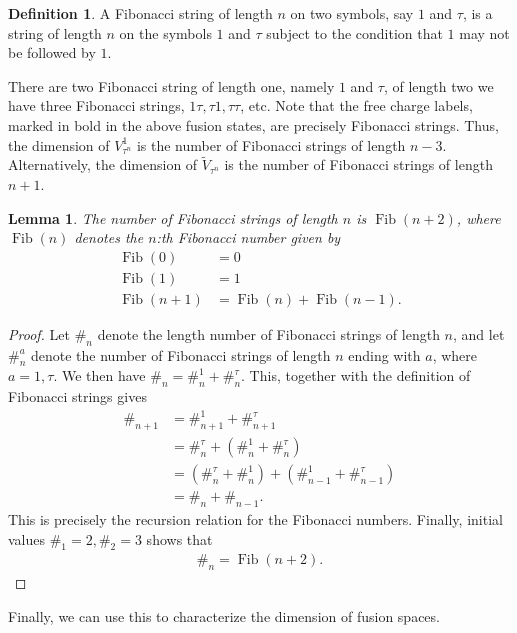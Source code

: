\documentclass[a4paper,10pt,oneside]{book}
\theoremstyle{plain}
\newtheorem{lemma}[theorem]{Lemma}
\theoremstyle{definition}
\newtheorem{definition}{Definition}[section]
\theoremstyle{remark}
\DeclareMathOperator{\Fib}{Fib}
\begin{document}
\begin{definition}\label{def:fibonacci strings}
  A Fibonacci string of length $n$ on two symbols, say $1$ and $τ$, is a string of length $n$ on the symbols $1$ and $τ$ subject to the condition that $1$ may not be followed by $1$.
\end{definition}

There are two Fibonacci string of length one, namely $1$ and $τ$, of length two we have three Fibonacci strings, $1τ, τ1, ττ$, etc. Note that the free charge labels, marked in bold in the above fusion states, are precisely Fibonacci strings. Thus, the dimension of $V_{τ^n}^1$ is the number of Fibonacci strings of length $n-3$. Alternatively, the dimension of $\widetilde{V}_{τ^n}$ is the number of Fibonacci strings of length $n+1$.

\begin{lemma}\label{lemma:fibonacci string length}
  The number of Fibonacci strings of length $n$ is $\Fib(n + 2)$, where $\Fib(n)$ denotes the $n$:th Fibonacci number given by
  \begin{align*}
    \Fib(0) &= 0 \\
    \Fib(1) &= 1 \\
    \Fib(n+1) &= \Fib(n) + \Fib(n-1).
  \end{align*}
\end{lemma}

\begin{proof}
  Let $\#_n$ denote the length number of Fibonacci strings of length $n$, and let $\#^a_n$ denote the number of Fibonacci strings of length $n$ ending with $a$, where $a = 1, τ$. We then have $\#_n = \#^1_n + \#^τ_n$. This, together with the definition of Fibonacci strings gives
  \begin{align*}
    \#_{n+1}
    &= \#^1_{n+1} + \#^τ_{n+1} \\
    &= \#^τ_n + \left(\#^1_n + \#^τ_n\right) \\
    &= \left(\#^τ_n + \#^1_n\right) + \left(\#^1_{n-1} + \#^τ_{n-1}\right) \\
    &= \#_n + \#_{n-1}.
  \end{align*}
  This is precisely the recursion relation for the Fibonacci numbers. Finally, initial values $\#_1 = 2, \#_2 = 3$ shows that
  \begin{align*}
    \#_n = \Fib(n+2).
  \end{align*}
\end{proof}

Finally, we can use this to characterize the dimension of fusion spaces.
\end{document}
